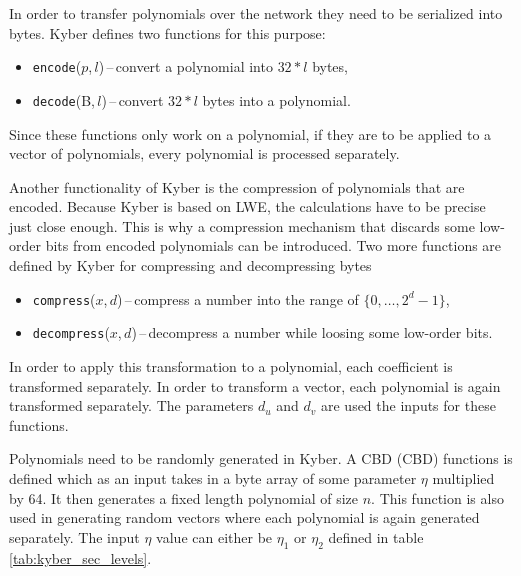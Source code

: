 In order to transfer polynomials over the network they need to be serialized into bytes. Kyber defines two functions for this purpose:
\begin{itemize}
  \item \texttt{encode}($p$,\,$l$)\,--\,convert a polynomial into $32*l$ bytes,
  \item \texttt{decode}(B,\,$l$)\,--\,convert $32*l$ bytes into a polynomial.
\end{itemize}
Since these functions only work on a polynomial, if they are to be applied to a vector of polynomials, every polynomial is processed separately.

Another functionality of Kyber is the compression of polynomials that are encoded. Because Kyber is based on LWE, the calculations have to be precise just close enough. This is why a compression mechanism that discards some low-order bits from encoded polynomials can be introduced. Two more functions are defined by Kyber for compressing and decompressing bytes
\begin{itemize}
  \item \texttt{compress}($x$,\,$d$)\,--\,compress a number into the range of $\{0,\dots,2^d-1\}$,
  \item \texttt{decompress}($x$,\,$d$)\,--\,decompress a number while loosing some low-order bits.
\end{itemize}
In order to apply this transformation to a polynomial, each coefficient is transformed separately. In order to transform a vector, each polynomial is again transformed separately. The parameters $d_u$ and $d_v$ are used the inputs for these functions.

Polynomials need to be randomly generated in Kyber. A CBD (\acl{CBD}) functions is defined which as an input takes in a byte array of some parameter $\eta$ multiplied by 64. It then generates a fixed length polynomial of size $n$. This function is also used in generating random vectors where each polynomial is again generated separately. The input $\eta$ value can either be $\eta_1$ or $\eta_2$ defined in table \ref{tab:kyber_sec_levels}.
